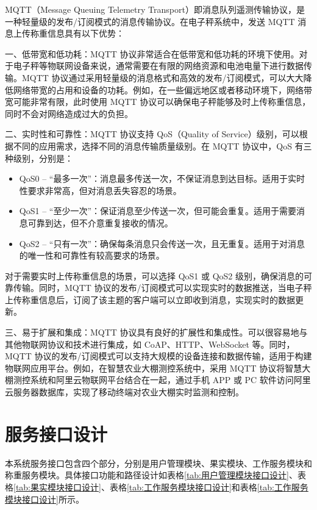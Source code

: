 MQTT（Message Queuing Telemetry Transport）即消息队列遥测传输协议，是一种轻量级的发布/订阅模式的消息传输协议。在电子秤系统中，发送 MQTT 消息上传称重信息具有以下优势：

一、低带宽和低功耗：MQTT 协议非常适合在低带宽和低功耗的环境下使用。对于电子秤等物联网设备来说，通常需要在有限的网络资源和电池电量下进行数据传输。MQTT 协议通过采用轻量级的消息格式和高效的发布/订阅模式，可以大大降低网络带宽的占用和设备的功耗。例如，在一些偏远地区或者移动环境下，网络带宽可能非常有限，此时使用 MQTT 协议可以确保电子秤能够及时上传称重信息，同时不会对网络造成过大的负担\cite{Jia2015}。

二、实时性和可靠性：MQTT 协议支持 QoS（Quality of Service）级别，可以根据不同的应用需求，选择不同的消息传输质量级别。在 MQTT 协议中，QoS 有三种级别\cite{Jia2015}，分别是：
\begin{itemize}
    \item QoS0 – “最多一次”：消息最多传送一次，不保证消息到达目标。适用于实时性要求非常高，但对消息丢失容忍的场景。
    \item QoS1 – “至少一次”：保证消息至少传送一次，但可能会重复。适用于需要消息可靠到达，但不介意重复接收的情况。
    \item QoS2 – “只有一次”：确保每条消息只会传送一次，且无重复。适用于对消息的唯一性和可靠性有较高要求的场景。
\end{itemize}

对于需要实时上传称重信息的场景，可以选择 QoS1 或 QoS2 级别，确保消息的可靠传输。同时，MQTT 协议的发布/订阅模式可以实现实时的数据推送，当电子秤上传称重信息后，订阅了该主题的客户端可以立即收到消息，实现实时的数据更新。

三、易于扩展和集成：MQTT 协议具有良好的扩展性和集成性。可以很容易地与其他物联网协议和技术进行集成，如 CoAP、HTTP、WebSocket 等。同时，MQTT 协议的发布/订阅模式可以支持大规模的设备连接和数据传输，适用于构建物联网应用平台。例如，在智慧农业大棚测控系统中，采用 MQTT 协议将智慧大棚测控系统和阿里云物联网平台结合在一起，通过手机 APP 或 PC 软件访问阿里云服务器数据库，实现了移动终端对农业大棚实时监测和控制\cite{Liang2020}。

\section{服务接口设计}

本系统服务接口包含四个部分，分别是用户管理模块、果实模块、工作服务模块和称重服务模块。具体接口功能和路径设计如表格\ref{tab:用户管理模块接口设计}、表格\ref{tab:果实模块接口设计}、表格\ref{tab:工作服务模块接口设计}和表格\ref{tab:工作服务模块接口设计}所示。


